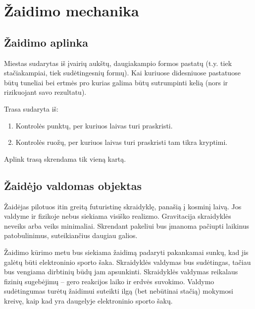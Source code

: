 \section{Žaidimo mechanika}
\subsection{Žaidimo aplinka}

Miestas sudarytas iš įvairių aukštų, daugiakampio formos pastatų (t.y. tiek stačiakampiai, tiek sudėtingesnių formų).
Kai kuriuose didesniuose pastatuose būtų tuneliai bei ertmės pro kurias galima būtų sutrumpinti kelią (nors ir rizikuojant savo rezultatu).

Trasa sudaryta iš:
\begin{enumerate}
\item Kontrolės punktų, per kuriuos laivas turi praskristi.
\item Kontrolės ruožų, per kuriuos laivas turi praskristi tam tikra kryptimi.
\end{enumerate}
Aplink trasą skrendama tik vieną kartą.

\subsection{Žaidėjo valdomas objektas}

Žaidėjas pilotuos itin greitą futuristinę skraidyklę, panašią į kosminį laivą.
Jos valdyme ir fizikoje nebus siekiama visiško realizmo.
Gravitacija skraidyklės neveiks arba veiks minimaliai.
Skrendant pakeliui bus įmanoma pačiupti laikinus patobulinimus, suteikiančius daugiau galios.

Žaidimo kūrimo metu bus siekiama žaidimą padaryti pakankamai sunkų, kad jis galėtų būti elektroninio sporto šaka.
Skraidyklės valdymas bus sudėtingas, tačiau bus vengiama dirbtinių būdų jam apsunkinti.
Skraidyklės valdymas reikalaus fizinių sugebėjimų -- gero reakcijos laiko ir erdvės suvokimo.
Valdymo sudėtingumas turėtų žaidimui suteikti ilgą (bet nebūtinai stačią) mokymosi kreivę, kaip kad yra daugelyje elektroninio sporto šakų.